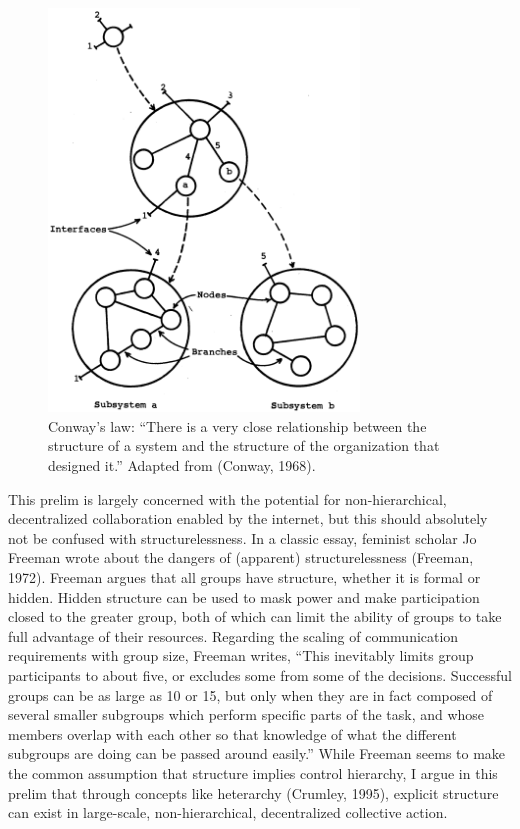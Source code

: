 \begin{figure}
\centering
\includegraphics[width=3.25in]{images/fig-conway.png}
\caption{
Conway's law: ``There is a very close relationship between the structure of a system and the structure of the organization that designed it.'' Adapted from (Conway, 1968).
\label{fig:conway}
}
\end{figure}

This prelim is largely concerned with the potential for non-hierarchical, decentralized collaboration enabled by the internet, but this should absolutely not be confused with structurelessness. In a classic essay, feminist scholar Jo Freeman wrote about the dangers of (apparent) structurelessness (Freeman, 1972). Freeman argues that all groups have structure, whether it is formal or hidden. Hidden structure can be used to mask power and make participation closed to the greater group, both of which can limit the ability of groups to take full advantage of their resources. Regarding the scaling of communication requirements with group size, Freeman writes, ``This inevitably limits group participants to about five, or excludes some from some of the decisions. Successful groups can be as large as 10 or 15, but only when they are in fact composed of several smaller subgroups which perform specific parts of the task, and whose members overlap with each other so that knowledge of what the different subgroups are doing can be passed around easily.'' While Freeman seems to make the common assumption that structure implies control hierarchy, I argue in this prelim that through concepts like heterarchy (Crumley, 1995), explicit structure can exist in large-scale, non-hierarchical, decentralized collective action.

